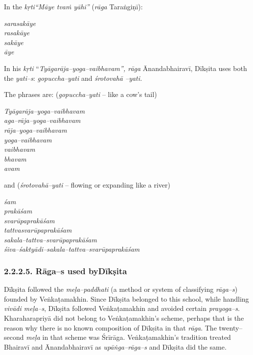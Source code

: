 In the \textit{kṛti“Māye tvaṁ yāhi”} (\textit{rāga} Taraṅgiṇī):

\begin{myquote}
\textit{sarasakāye}\\\textit{rasakāye}\\\textit{sakāye}\\\textit{āye}
\end{myquote}

In his \textit{kṛti} “\textit{Tyāgarāja–yoga–vaibhavam”, rāga} Ānandabhairavī, Dīkṣita uses both the \textit{yati–s}: \textit{gopuccha–yati} and \textit{śrotovahā –yati.}

The phrases are: (\textit{gopuccha–yati} – like a cow’s tail)

\begin{myquote}
\textit{Tyāgarāja–yoga–vaibhavam}\\\textit{aga–rāja–yoga–vaibhavam}\\\textit{rāja–yoga–vaibhavam}\\\textit{yoga–vaibhavam}\\\textit{vaibhavam}\\\textit{bhavam}\\\textit{avam}
\end{myquote}

and (\textit{śrotovahā–yati} – flowing or expanding like a river)

\begin{myquote}
\textit{śam}\\\textit{prakāśam}\\\textit{svarūpaprakāśam}\\\textit{tattvasvarūpaprakāśam}\\\textit{sakala–tattva–svarūpaprakāśam}\\\textit{śiva–śaktyādi–sakala–tattva–svarūpaprakāśam}
\end{myquote}


\subsubsection*{2.2.2.5. Rāga–s used byDīkṣita}

Dīkṣita followed the \textit{meḷa–paddhati} (a method or system of classifying \textit{rāga–s}) founded by Veṅkaṭamakhin. Since Dīkṣita belonged to this school, while handling \textit{vivādi meḷa–s}, Dīkṣita followed Veṅkaṭamakhin and avoided certain \textit{prayoga–s}. Kharaharapriyā did not belong to Veṅkaṭamakhin’s scheme, perhaps that is the reason why there is no known composition of Dīkṣita in that \textit{rāga}. The twenty–second \textit{meḷa} in that scheme was Śrīrāga. Veṅkaṭamakhin’s tradition treated Bhairavī and Ānandabhairavī as \textit{upāṅga–rāga–s} and Dīkṣita did the same.

